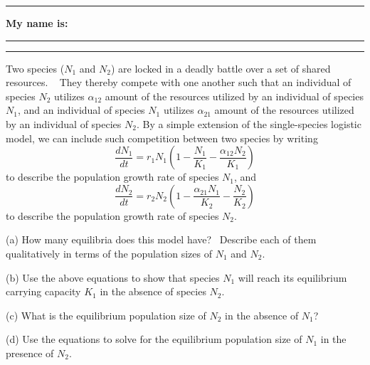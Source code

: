 \documentclass{article}
\newcommand*{\blanks}[1][4em]{\rule{#1}{.4pt}}
\begin{document}
\noindent{}

\rule[0.5ex]{\linewidth}{1pt}
\begin{center}
	\textbf{My name is:} \blanks[150pt]
\end{center}
\rule[0.5ex]{\linewidth}{1pt}

Two species ($N_1$ and $N_2$) are locked in a deadly battle over a set of shared resources.   They thereby compete with one another such that an individual of species $N_2$ utilizes $\alpha_{12}$ amount of the resources utilized by an individual of species $N_1$, and an individual of species $N_1$ utilizes $\alpha_{21}$ amount of the resources utilized by an individual of species $N_2$.  By a simple extension of the single-species logistic model, we can include such competition between two species by writing
\begin{equation*}
	\frac{dN_1}{dt}=r_1 N_1 \left( 1-\frac{N_1}{K_1}-\frac{\alpha_{12}N_2}{K_1} \right )
\end{equation*}
to describe the population growth rate of species $N_1$, and
\begin{equation*}
	\frac{dN_2}{dt}=r_2 N_2 \left( 1-\frac{\alpha_{21}N_1}{K_2}-\frac{N_2}{K_2} \right )
\end{equation*}
to describe the population growth rate of species $N_2$.

\vspace{1cm}

(a) How many equilibria does this model have?  Describe each of them qualitatively in terms of the population sizes of $N_1$ and $N_2$.\\
\vspace{3.5cm}

(b) Use the above equations to show that species $N_1$ will reach its equilibrium carrying capacity $K_1$ in the absence of species $N_2$.\\
\vspace{3.5cm}

(c) What is the equilibrium population size of $N_2$ in the absence of $N_1$?\\
\vspace{1cm}


(d) Use the equations to solve for the equilibrium population size of $N_1$ in the presence of $N_2$. 
\end{document}
